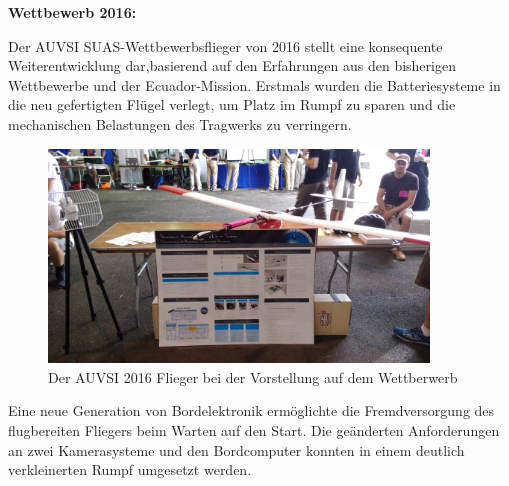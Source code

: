 \clearpage

\textbf{Wettbewerb 2016:}

Der AUVSI SUAS-Wettbewerbsflieger von 2016 stellt eine konsequente Weiterentwicklung dar,basierend auf den Erfahrungen aus den bisherigen Wettbewerbe und der Ecuador-Mission. Erstmals wurden die Batteriesysteme in die neu gefertigten Flügel verlegt, um Platz im Rumpf zu sparen und die mechanischen Belastungen des Tragwerks zu verringern.

\begin{figure}[H]
\centering
\includegraphics[width=0.9\textwidth]{bilder/Fotos/AUVSI_2016_Display.jpg} 
\caption{Der AUVSI 2016 Flieger bei der Vorstellung auf dem Wettberwerb} 
\label{Der AUVSI 2016 Flieger beim Display auf dem Wettberwerb}
\end{figure}

Eine neue Generation von Bordelektronik ermöglichte die Fremdversorgung des flugbereiten Fliegers beim Warten auf den Start. Die geänderten Anforderungen an zwei Kamerasysteme und den Bordcomputer konnten in einem deutlich verkleinerten Rumpf umgesetzt werden. 





